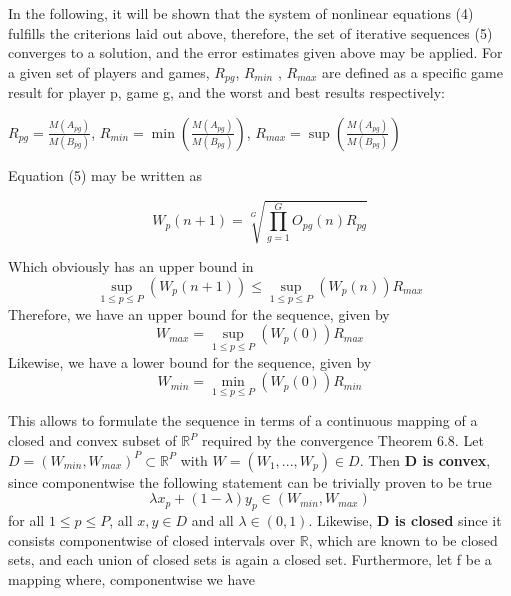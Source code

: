 \documentclass[a4paper]{article}
\begin{document}
In the following, it will be shown that the system of nonlinear equations (4) fulfills the criterions laid out above, therefore, the set of iterative
sequences (5) converges to a solution, and the error estimates given above may be applied.
\newline\newline\newline
For a given set of players and games, $R_{pg}$, $R_{min}$ , $R_{max}$ are defined as a specific game result for player p, game g, and the worst and best results respectively: 
\newline \newline
\begin{center}
$ R_{pg} = \frac{M(A_{pg})}{M(B_{pg})} $, $ R_{min} = \displaystyle\min(\frac{M(A_{pg})}{M(B_{pg})}) $, $R_{max} = \displaystyle\sup(\frac{M(A_{pg})}{M(B_{pg})}) $
\end{center}

Equation (5) may be written as 

\begin{equation}
W_p(n+1) = \sqrt[G]{\displaystyle\prod_{g=1}^{G}{O_{pg}(n)R_{pg}}} 
\end{equation} 

Which obviously has an upper bound in $$\displaystyle\sup_{1 \leq p \leq P}(W_p(n+1)) \leq \displaystyle\sup_{1 \leq p \leq P}(W_p(n))R_{max} $$
Therefore, we have an upper bound for the sequence, given by $$ W_{max} = \displaystyle\sup_{1 \leq p \leq P}(W_p(0)) R_{max} $$
Likewise, we have a lower bound for the sequence, given by $$ W_{min} = \displaystyle\min_{1 \leq p \leq P}(W_p(0)) R_{min} $$
\newline\newline

This allows to formulate the sequence in terms of a continuous mapping of a closed and convex subset of $\mathbb{R}^P$ required by the convergence Theorem 6.8.
\newline\newline
Let $ D = ( W_{min}, W_{max} )^P \subset \mathbb{R}^P $ with $ W = (W_1, ..., W_p) \in D$. Then \textbf{D is convex}, since componentwise the following statement can
be trivially proven to be true $$ \lambda x_p + ( 1 - \lambda ) y_p \in ( W_{min}, W_{max} )$$ for all $ 1 \leq p \leq P$, all $ x,y \in D $ and all 
$ \lambda \in (0,1)$. Likewise, \textbf{D is closed} since it consists componentwise of closed intervals over $ \mathbb{R} $,
which are known to be closed sets, and each union of closed sets is again a closed set.  
\newline\newline
Furthermore, let f be a mapping where, componentwise we have
\end{document}
